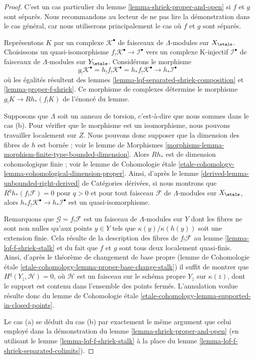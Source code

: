 \begin{proof}
C'est un cas particulier du lemme \ref{lemma-shriek-proper-and-open}
si $f$ et $g$ sont séparés. Nous recommandons au lecteur de ne pas lire la démonstration
dans le cas général,
car nous utiliserons principalement le cas où $f$ et $g$ sont séparés.

\medskip\noindent
Représentons $K$ par un complexe $\mathcal{K}^\bullet$ de faisceaux de
$\Lambda$-modules sur $X_\etale$. Choisissons un quasi-isomorphisme
$f_!\mathcal{K}^\bullet \to \mathcal{I}^\bullet$ vers un complexe K-injectif
$\mathcal{I}^\bullet$ de faisceaux de $\Lambda$-modules sur $Y_\etale$.
Considérons le morphisme
$$
g_!\mathcal{K}^\bullet =
h_!f_!\mathcal{K}^\bullet =
h_*f_!\mathcal{K}^\bullet
\longrightarrow
h_*\mathcal{I}^\bullet
$$
où les égalités résultent des
lemmes \ref{lemma-lqf-separated-shriek-composition}
et \ref{lemma-proper-f-shriek}. Ce morphisme de complexes détermine le morphisme
$g_!K \to Rh_*(f_!K)$ de l'énoncé du lemme.

\medskip\noindent
Supposons que $\Lambda$ soit un anneau de torsion, c'est-à-dire que nous sommes dans le cas (b). Pour vérifier que le morphisme
est un isomorphisme, nous pouvons travailler localement sur $Z$.
Nous pouvons donc supposer que la dimension des fibres de $h$ est bornée ;
voir le lemme de Morphismes
\ref{morphisms-lemma-morphism-finite-type-bounded-dimension}.
Alors $Rh_*$ est de dimension cohomologique finie ; voir le
lemme de Cohomologie étale
\ref{etale-cohomology-lemma-cohomological-dimension-proper}.
Ainsi, d'après le lemme \ref{derived-lemma-unbounded-right-derived} de Catégories dérivées,
si nous montrons que $R^qh_*(f_!\mathcal{F}) = 0$ pour $q > 0$
et pour tout faisceau $\mathcal{F}$ de $\Lambda$-modules sur $X_\etale$, alors
$h_*f_!\mathcal{K}^\bullet \to h_*\mathcal{I}^\bullet$ est un quasi-isomorphisme.

\medskip\noindent
Remarquons que $\mathcal{G} = f_!\mathcal{F}$ est un faisceau de $\Lambda$-modules
sur $Y$ dont les fibres ne sont non nulles qu'aux points $y \in Y$ tels que
$\kappa(y)/\kappa(h(y))$ soit une extension finie. Cela résulte de la
description des fibres de $f_!\mathcal{F}$ au
lemme \ref{lemma-lqf-f-shriek-stalk}
et du fait que $f$ et $g$ sont tous deux localement quasi-finis.
Ainsi, d'après le théorème de changement de base propre (lemme de Cohomologie étale
\ref{etale-cohomology-lemma-proper-base-change-stalk})
il suffit de montrer que $H^q(Y_{\overline{z}}, \mathcal{H}) = 0$,
où $\mathcal{H}$ est un faisceau sur le schéma propre $Y_{\overline{z}}$
sur $\kappa(\overline{z})$, dont le support est contenu dans l'ensemble
des points fermés. L'annulation voulue résulte donc du lemme de Cohomologie étale
\ref{etale-cohomology-lemma-supported-in-closed-points}.

\medskip\noindent
Le cas (a) se déduit du cas (b) par exactement le même argument que celui employé
dans la démonstration du lemme \ref{lemma-shriek-proper-and-open}
(en utilisant le lemme \ref{lemma-lqf-f-shriek-stalk} à la place du
lemme \ref{lemma-lqf-f-shriek-separated-colimits}).
\end{proof}







